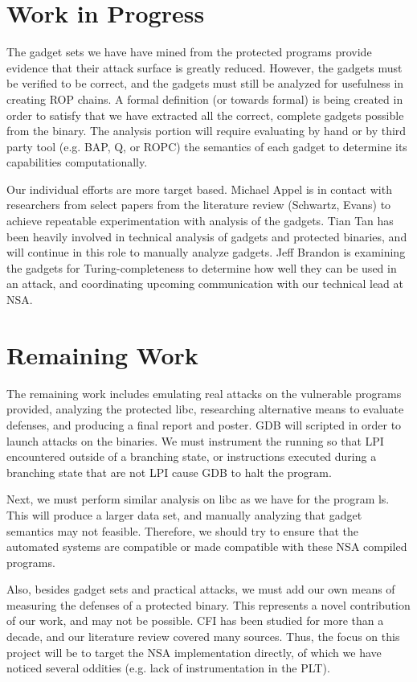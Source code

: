 \documentclass[letterpaper,10pt]{article}
\begin{document}
\section{Work in Progress}
The gadget sets we have have mined from the protected programs provide evidence that their attack surface is greatly reduced. However, the gadgets must be verified to be correct, and the gadgets must still be analyzed for usefulness in creating ROP chains. A formal definition (or towards formal) is being created in order to satisfy that we have extracted all the correct, complete gadgets possible from the binary. The analysis portion will require evaluating by hand or by third party tool (e.g. BAP, Q, or ROPC) the semantics of each gadget to determine its capabilities computationally.

Our individual efforts are more target based. Michael Appel is in contact with researchers from select papers from the literature review (Schwartz, Evans) to achieve repeatable experimentation with analysis of the gadgets. Tian Tan has been heavily involved in technical analysis of gadgets and protected binaries, and will continue in this role to manually analyze gadgets. Jeff Brandon is examining the gadgets for Turing-completeness to determine how well they can be used in an attack, and coordinating upcoming communication with our technical lead at NSA.

\section{Remaining Work}
The remaining work includes emulating real attacks on the vulnerable programs provided, analyzing the protected libc, researching alternative means to evaluate defenses, and producing a final report and poster. GDB will scripted in order to launch attacks on the binaries. We must instrument the running so that LPI encountered outside of a branching state, or instructions executed during a branching state that are not LPI cause GDB to halt the program.

Next, we must perform similar analysis on libc as we have for the program ls. This will produce a larger data set, and manually analyzing that gadget semantics may not feasible. Therefore, we should try to ensure that the automated systems are compatible or made compatible with these NSA compiled programs.

Also, besides gadget sets and practical attacks, we must add our own means of measuring the defenses of a protected binary. This represents a novel contribution of our work, and may not be possible. CFI has been studied for more than a decade, and our literature review covered many sources. Thus, the focus on this project will be to target the NSA implementation directly, of which we have noticed several oddities (e.g. lack of instrumentation in the PLT).
\end{document}
